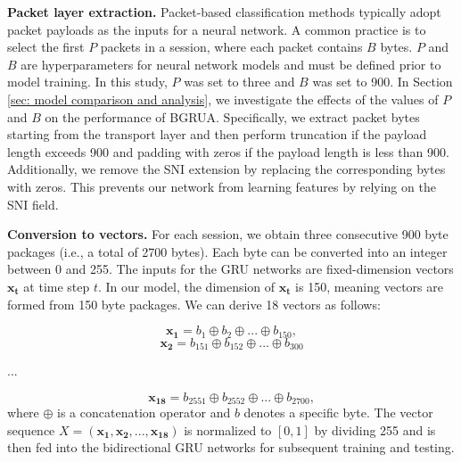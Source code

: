 \documentclass[preprint,12pt]{elsarticle}
\begin{document}
\noindent\textbf{Packet layer extraction.} 
Packet-based classification methods typically adopt packet payloads as the inputs for a neural network. A common practice is to select the first $P$ packets in a session, where each packet contains $B$ bytes. $P$ and $B$ are hyperparameters for neural network models and must be defined prior to model training. In this study, $P$ was set to three and $B$ was set to 900. In Section \ref{sec: model comparison and analysis}, we investigate the effects of the values of $P$ and $B$ on the performance of BGRUA. Specifically, we extract packet bytes starting from the transport layer and then perform truncation if the payload length exceeds 900 and padding with zeros if the payload length is less than 900. Additionally, we remove the SNI extension by replacing the corresponding bytes with zeros. This prevents our network from learning features by relying on the SNI field.  

\noindent\textbf{Conversion to vectors.} 
For each session, we obtain three consecutive 900 byte packages (i.e., a total of 2700 bytes). Each byte can be converted into an integer between 0 and 255. The inputs for the GRU networks are fixed-dimension vectors $\mathbf{x_t}$ at time step $t$. In our model, the dimension of $\mathbf{x_t}$ is 150, meaning vectors are formed from 150 byte packages. We can derive 18 vectors as follows:


\begin{equation}
    \mathbf{x_1} = b_1 \oplus b_2 \oplus ... \oplus b_{150},
\end{equation}
\begin{equation}
    \mathbf{x_2} = b_{151} \oplus b_{152} \oplus ... \oplus b_{300}
\end{equation}
\begin{center}
    ...
\end{center}
\begin{equation}
    \mathbf{x_{18}} = b_{2551} \oplus b_{2552} \oplus ... \oplus b_{2700},
\end{equation}
where $\oplus$ is a concatenation operator and $b$ denotes a specific byte. The vector sequence $X = (\mathbf{x_1}, \mathbf{x_2},..., \mathbf{x_{18}} )$ is normalized to $[0, 1]$ by dividing 255 and is then fed into the bidirectional GRU networks for subsequent training and testing.
\end{document}
